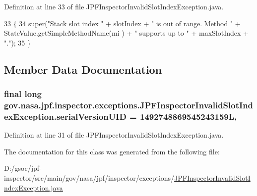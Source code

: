 Definition at line 33 of file J\+P\+F\+Inspector\+Invalid\+Slot\+Index\+Exception.\+java.


\begin{DoxyCode}
33                                                                                                 \{
34     super(\textcolor{stringliteral}{"Stack slot index "} + slotIndex + \textcolor{stringliteral}{" is out of range. Method "} + StateValue.getSimpleMethodName(mi
      ) + \textcolor{stringliteral}{" supports up to "} + maxSlotIndex + \textcolor{stringliteral}{"."});
35   \}
\end{DoxyCode}


\subsection{Member Data Documentation}
\subsubsection[{\texorpdfstring{serial\+Version\+U\+ID}{serialVersionUID}}]{\setlength{\rightskip}{0pt plus 5cm}final long gov.\+nasa.\+jpf.\+inspector.\+exceptions.\+J\+P\+F\+Inspector\+Invalid\+Slot\+Index\+Exception.\+serial\+Version\+U\+ID = 1492748869545243159L\hspace{0.3cm}{\ttfamily [static]}, {\ttfamily [private]}}\hypertarget{classgov_1_1nasa_1_1jpf_1_1inspector_1_1exceptions_1_1_j_p_f_inspector_invalid_slot_index_exception_ae91307aa9eed28c640cd670b678696b2}{}\label{classgov_1_1nasa_1_1jpf_1_1inspector_1_1exceptions_1_1_j_p_f_inspector_invalid_slot_index_exception_ae91307aa9eed28c640cd670b678696b2}


Definition at line 31 of file J\+P\+F\+Inspector\+Invalid\+Slot\+Index\+Exception.\+java.



The documentation for this class was generated from the following file\+:\begin{DoxyCompactItemize}
\item 
D\+:/gsoc/jpf-\/inspector/src/main/gov/nasa/jpf/inspector/exceptions/\hyperlink{_j_p_f_inspector_invalid_slot_index_exception_8java}{J\+P\+F\+Inspector\+Invalid\+Slot\+Index\+Exception.\+java}\end{DoxyCompactItemize}
